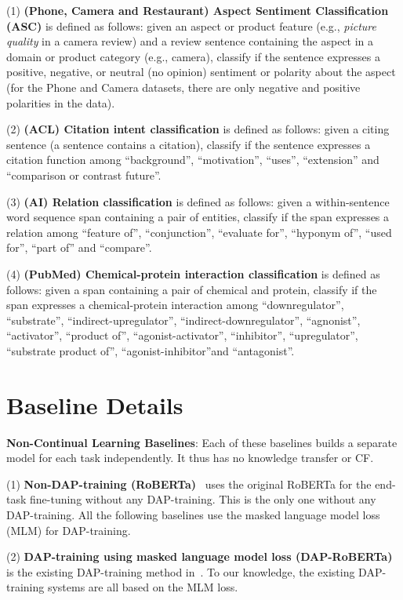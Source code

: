 \documentclass{article} \usepackage{iclr2023_conference,times}
\begin{document}
(1) \textbf{(Phone, Camera and Restaurant) Aspect Sentiment Classification (ASC)} is defined as follows: given an aspect or product feature (e.g., \textit{picture quality} in a camera review) and a review sentence containing the aspect in a domain or product category (e.g., camera), classify if the sentence expresses a positive, negative, or neutral (no opinion) sentiment or polarity about the aspect (for the Phone and Camera datasets, there are only negative and positive polarities in the data).

(2) \textbf{(ACL) Citation intent classification} is defined as follows: given a citing sentence (a sentence contains a citation), classify if the sentence expresses a citation function among ``background'', ``motivation'', ``uses'', ``extension'' and ``comparison or contrast future''.

(3) \textbf{(AI) Relation classification} is defined as follows: given a within-sentence word sequence span containing a pair of entities, classify if the span expresses a relation among ``feature of'', ``conjunction'', ``evaluate for'', ``hyponym of'', ``used for'', ``part of'' and ``compare''.

(4) \textbf{(PubMed) Chemical-protein interaction classification} is defined as follows: given a span containing a pair of chemical and protein, classify if the span expresses a chemical-protein interaction among ``downregulator'', ``substrate'', ``indirect-upregulator'', ``indirect-downregulator'', ``agnonist'', ``activator'', ``product of'', ``agonist-activator'', ``inhibitor'', ``upregulator'', ``substrate product of'', ``agonist-inhibitor''and ``antagonist''.




\section{Baseline Details}
\label{ap:baseline}

\textbf{Non-Continual Learning Baselines}: Each of these baselines builds a separate model for each
task independently.
It thus has no knowledge transfer or CF. 


(1) \textbf{Non-DAP-training (RoBERTa)}~\cite{DBLP:journals/corr/abs-1907-11692} uses the original RoBERTa for the end-task fine-tuning without any DAP-training. This is the only one without any DAP-training. All the following baselines use the masked language model loss (MLM) for DAP-training. 

(2) \textbf{DAP-training using masked language model loss (DAP-RoBERTa)} is the existing DAP-training method in~\cite{DBLP:conf/acl/GururanganMSLBD20}. To our knowledge, the existing DAP-training systems are all based on the MLM loss. 
\end{document}
